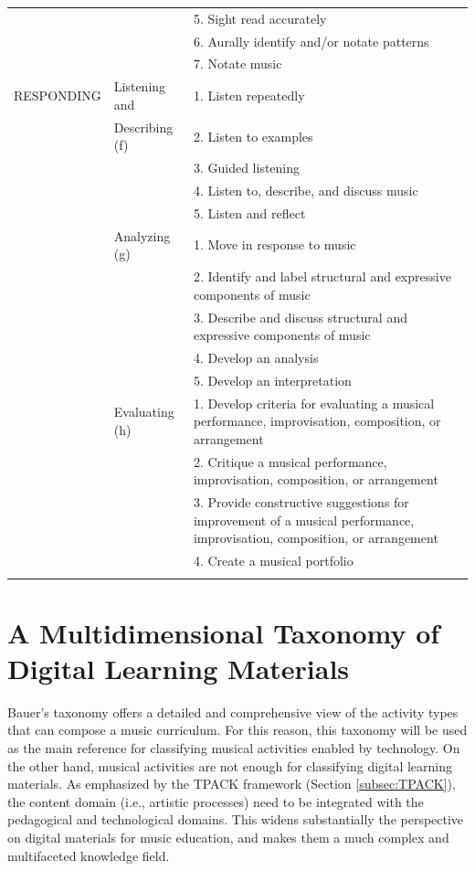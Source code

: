 \documentclass[10pt,journal,compsoc]{IEEEtran}
\begin{document}
\begin{table}[htbp]
\begin{tabular}{p{}p{}p{}}
		&  & 5. Sight read accurately\\
		&  & 6. Aurally identify and/or notate patterns\\
		&  & 7. Notate music\\
		
		\hline\noalign{\smallskip}
		RESPONDING & Listening and & 1. Listen repeatedly\\
		& Describing (f)& 2. Listen to examples\\
		& & 3. Guided listening\\
		& & 4. Listen to, describe, and discuss music\\
		& & 5. Listen and reflect\\
		
		\cline{2-3}
		
		& Analyzing (g)& 1. Move in response to music\\
		& & 2. Identify and label structural and expressive components of music\\
		& & 3. Describe and discuss structural and expressive components of music\\
		& & 4. Develop an analysis\\
		& & 5. Develop an interpretation\\
		
		\cline{2-3}
		
		&  Evaluating (h)& 1. Develop criteria for evaluating a musical performance, improvisation, composition, or arrangement\\
		&  & 2. Critique a musical performance, improvisation, composition, or arrangement\\
		&  & 3. Provide constructive suggestions for improvement of a musical performance, improvisation, composition, or arrangement\\
		&  & 4. Create a musical portfolio\\
		\hline\noalign{\smallskip}
	\end{tabular}
\end{table}



\section{A Multidimensional Taxonomy of Digital Learning Materials}
\label{sec:MTDLM}

Bauer's taxonomy   
offers a detailed and comprehensive view of the activity types that can compose a music curriculum. For this reason, this taxonomy will be used as the main reference for classifying musical activities enabled by technology. 
%
On the other hand, musical activities are not enough for classifying digital learning materials. As emphasized by the TPACK framework (Section \ref{subsec:TPACK}), the content domain (i.e., artistic processes) need to be integrated with the pedagogical and technological domains. This widens substantially the perspective on digital materials for music education, and makes them a much complex and multifaceted knowledge field. 
\end{document}
